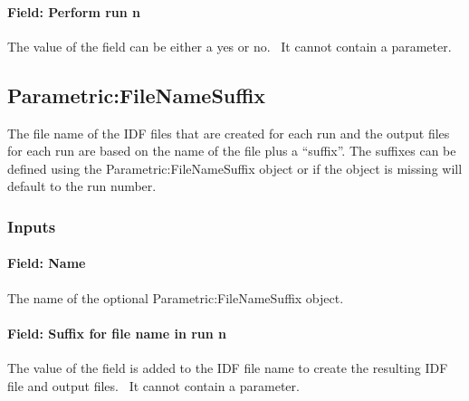 \paragraph{Field: Perform run n}\label{field-perform-run-n}

The value of the field can be either a yes or no.~ It cannot contain a parameter.

\subsection{Parametric:FileNameSuffix}\label{parametricfilenamesuffix}

The file name of the IDF files that are created for each run and the output files for each run are based on the name of the file plus a ``suffix''. The suffixes can be defined using the Parametric:FileNameSuffix object or if the object is missing will default to the run number.

\subsubsection{Inputs}\label{inputs-3-023}

\paragraph{Field: Name}\label{field-name-2-024}

The name of the optional Parametric:FileNameSuffix object.

\paragraph{Field: Suffix for file name in run n}\label{field-suffix-for-file-name-in-run-n}

The value of the field is added to the IDF file name to create the resulting IDF file and output files.~ It cannot contain a parameter.